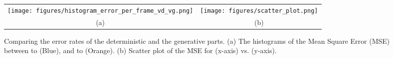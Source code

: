 \documentclass{article}
\theoremstyle{plain}
\theoremstyle{definition}
\theoremstyle{remark}
\begin{document}
\begin{figure*}[t]
    \centering
    \begin{minipage}{.66\linewidth}\begin{tabular}{cc}
\texttt{[image: figures/histogram\_error\_per\_frame\_vd\_vg.png]}&
   \texttt{[image: figures/scatter\_plot.png]}\\
   (a) & (b)\\
   \end{tabular}
\end{minipage}\hfill \begin{minipage}{.30\linewidth}\caption{Comparing the error rates of the deterministic and the generative parts. (a) The histograms of the Mean Square Error (MSE) between  to  (Blue), and  to  (Orange). (b) Scatter plot of the MSE for  (x-axis) vs.  (y-axis).}
    \label{fig:hist_error}
    \label{fig:scatter_plot}
    \end{minipage}
\end{figure*}
\end{document}
